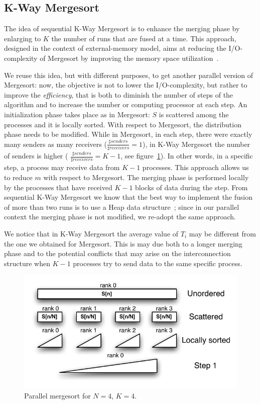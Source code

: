 \subsection{K-Way Mergesort}
The idea of sequential K-Way Mergesort is to enhance the merging phase by enlarging to $K$ the number of runs that are fused at a time. This approach, designed in the context of external-memory model, aims at reducing the I/O-complexity of Mergesort by improving the memory space utilization~\cite{FERR}. 

We reuse this idea, but with different purposes, to get another parallel version of Mergesort: now, the objective is not to lower the I/O-complexity, but rather to improve the \textit{efficiency}, that is both to diminish the number of steps of the algorithm and to increase the number or computing processor at each step. An initialization phase takes place as in Mergesort: $S$ is scattered among the processes and it is locally sorted. With respect to Mergesort, the distribution phase needs to be modified. While in Mergesort, in each step, there were exactly many senders as many receivers ($\frac{\sharp senders}{\sharp receivers} = 1$), in K-Way Mergesort the number of senders is higher ( $\frac{\sharp senders}{\sharp receivers} = K - 1$, see figure~\ref{k-merge-dist}). In other words, in a specific step, a process may receive data from $K-1$ processes. This approach allows us to reduce $m$ with respect to Mergesort. The merging phase is performed locally by the processes that have received $K-1$ blocks of data during the step. From sequential K-Way Mergesort we know that the best way to implement the fusion of more than two runs is to use a Heap data structure~\cite{FERR}; since in our parallel context the merging phase is not modified, we re-adopt the same approach.

We notice that in K-Way Mergesort the average value of $T_i$ may be different from the one we obtained for Mergesort. This is may due both to a longer merging phase and to the potential conflicts that may arise on the interconnection structure when $K-1$ processes try to send data to the same specific process.

\begin{figure}[h]
        \centerline{
               \mbox{\includegraphics[scale=0.70]{kmerge-pict1}}
        }
        \caption{Parallel mergesort for $N = 4$, $K = 4$.}
        \label{k-merge-dist}
\end{figure}

